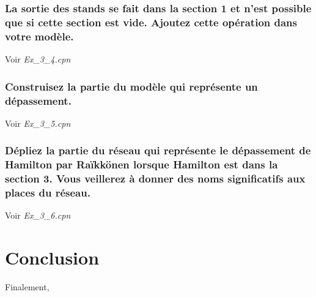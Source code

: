 \documentclass[french]{article}
\begin{document}
\subsubsection{La sortie des stands se fait dans la section 1 et n’est possible que si cette section est vide. Ajoutez cette
  opération dans votre modèle.}
Voir \textit{Ex\_3\_4.cpn} \\
\subsubsection{Construisez la partie du modèle qui
  représente un dépassement.}
Voir \textit{Ex\_3\_5.cpn} \\
\subsubsection{Dépliez la partie du réseau qui représente le dépassement de Hamilton par Raïkkönen lorsque Hamilton est dans
  la section 3. Vous veillerez à donner des noms significatifs aux places du réseau.}
Voir \textit{Ex\_3\_6.cpn} \\
\section{Conclusion}
Finalement,
\end{document}
